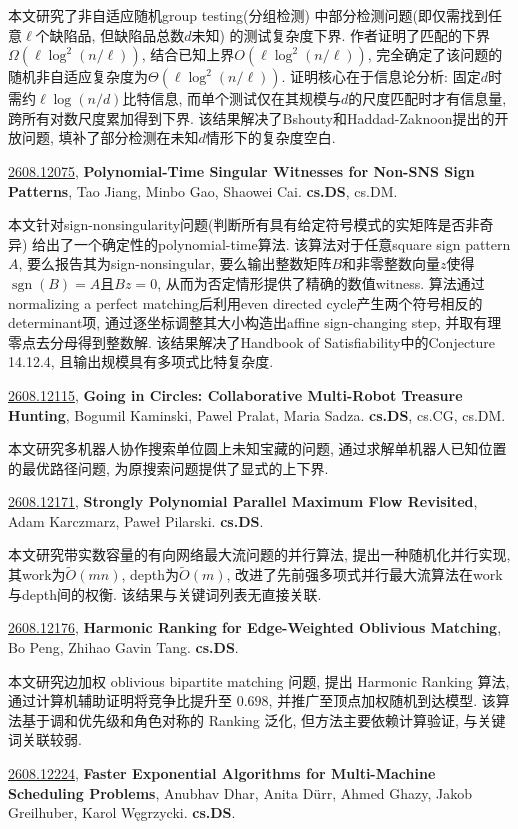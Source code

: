 \documentclass[9pt, a4paper]{article}
\theoremstyle{plain}
\theoremstyle{definition}
\theoremstyle{remark}
\newcommand{\arxivwithtarget}[3]{\hypertarget{#1}{}\href{https://arxiv.org/abs/#1}{#1}, \textbf{\textcolor{arxivblue}{#2}}, #3. }
\begin{document}
本文研究了非自适应随机group testing(分组检测) 中部分检测问题(即仅需找到任意$\ell$个缺陷品, 但缺陷品总数$d$未知) 的测试复杂度下界. 作者证明了匹配的下界$\Omega(\ell\log^2(n/\ell))$, 结合已知上界$O(\ell\log^2(n/\ell))$, 完全确定了该问题的随机非自适应复杂度为$\Theta(\ell\log^2(n/\ell))$. 证明核心在于信息论分析: 固定$d$时需约$\ell\log(n/d)$比特信息, 而单个测试仅在其规模与$d$的尺度匹配时才有信息量, 跨所有对数尺度累加得到下界. 该结果解决了Bshouty和Haddad-Zaknoon提出的开放问题, 填补了部分检测在未知$d$情形下的复杂度空白.


\arxivwithtarget{2608.12075}{Polynomial-Time Singular Witnesses for Non-SNS Sign Patterns}{Tao Jiang, Minbo Gao, Shaowei Cai}\textbf{cs.DS}, cs.DM.

本文针对sign-nonsingularity问题(判断所有具有给定符号模式的实矩阵是否非奇异) 给出了一个确定性的polynomial-time算法. 该算法对于任意square sign pattern $A$, 要么报告其为sign-nonsingular, 要么输出整数矩阵$B$和非零整数向量$z$使得$\operatorname{sgn}(B)=A$且$Bz=0$, 从而为否定情形提供了精确的数值witness. 算法通过normalizing a perfect matching后利用even directed cycle产生两个符号相反的determinant项, 通过逐坐标调整其大小构造出affine sign-changing step, 并取有理零点去分母得到整数解. 该结果解决了Handbook of Satisfiability中的Conjecture 14.12.4, 且输出规模具有多项式比特复杂度.


\arxivwithtarget{2608.12115}{Going in Circles: Collaborative Multi-Robot Treasure Hunting}{Bogumil Kaminski, Pawel Pralat, Maria Sadza}\textbf{cs.DS}, cs.CG, cs.DM.

本文研究多机器人协作搜索单位圆上未知宝藏的问题, 通过求解单机器人已知位置的最优路径问题, 为原搜索问题提供了显式的上下界.


\arxivwithtarget{2608.12171}{Strongly Polynomial Parallel Maximum Flow Revisited}{Adam Karczmarz, Paweł Pilarski}\textbf{cs.DS}.

本文研究带实数容量的有向网络最大流问题的并行算法, 提出一种随机化并行实现, 其work为$\tilde{O}(mn)$, depth为$\tilde{O}(m)$, 改进了先前强多项式并行最大流算法在work与depth间的权衡. 该结果与关键词列表无直接关联.


\arxivwithtarget{2608.12176}{Harmonic Ranking for Edge-Weighted Oblivious Matching}{Bo Peng, Zhihao Gavin Tang}\textbf{cs.DS}.

本文研究边加权 oblivious bipartite matching 问题, 提出 Harmonic Ranking 算法, 通过计算机辅助证明将竞争比提升至 $0.698$, 并推广至顶点加权随机到达模型. 该算法基于调和优先级和角色对称的 Ranking 泛化, 但方法主要依赖计算验证, 与关键词关联较弱.


\arxivwithtarget{2608.12224}{Faster Exponential Algorithms for Multi-Machine Scheduling Problems}{Anubhav Dhar, Anita Dürr, Ahmed Ghazy, Jakob Greilhuber, Karol Węgrzycki}\textbf{cs.DS}.
\end{document}

